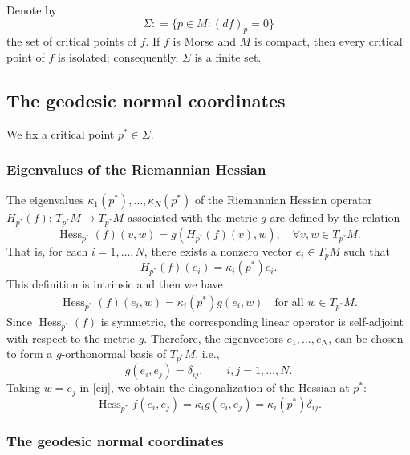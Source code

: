 \documentclass[12pt,reqno]{amsart}
\numberwithin{equation}{section}
\begin{document}
Denote by
\[
\Sigma:
=
\{p\in M:(df)_p=0\}
\]
the set of critical points of \(f\). If \(f\) is Morse and \(M\) is compact, then every critical point of \(f\) is isolated; consequently, \(\Sigma\) is a finite set.




  
\subsection{The geodesic normal coordinates}
We fix a critical point \(p^* \in \Sigma\).

\subsubsection{Eigenvalues of the Riemannian Hessian}

The eigenvalues $\kappa_1(p^*),\dots,\kappa_N(p^*)$ of the Riemannian Hessian operator $H_{p^*}(f)$: $T_{p^*} M\to T_{p^*} M$ associated with the metric $g$ are defined by the relation
\[
\operatorname{Hess}_{p^*} (f)(v, w) =g(H_{p^*}(f)(v),w), 
\quad \forall  v,w\in T_{p^*} M.
\]
That is, for each $i = 1, \ldots, N$, there exists a nonzero vector $e_i \in T_p M$ such that
\[H_{p^*}(f)(e_i)=\kappa_i({p^*})e_i.
\]
This definition is intrinsic and then we have
\begin{align}\label{eij}
    \operatorname{Hess}_{p^*}(f) (e_i, w) = \kappa_i(p^*) g(e_i, w) \quad\text{for all } w\in T_{p^*}M.
\end{align}
Since $\operatorname{Hess}_{p^*}(f)$ is symmetric, the corresponding
linear operator is self-adjoint with respect to the metric $g$.
Therefore, the eigenvectors
$e_1,\ldots,e_N$, can be chosen to form a $g$-orthonormal
basis of $T_{p^*}M$, i.e.,
\[
g(e_i,e_j)=\delta_{ij},
\qquad i,j=1,\ldots,N.
\]
Taking $w=e_j$ in \eqref{eij}, we obtain the diagonalization of the Hessian at $p^*$:
\begin{equation}\label{eq:hess-eigenbasis}
\operatorname{Hess}_{p^*}f(e_i,e_j)
=
\kappa_i g(e_i,e_j)
=
\kappa_i(p^*)\delta_{ij}.
\end{equation}

\subsubsection{The geodesic normal coordinates}
\end{document}
